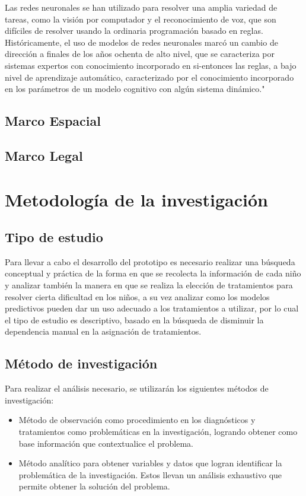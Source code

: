 		Las redes neuronales se han utilizado para resolver una amplia variedad de tareas, como la visión por computador y el reconocimiento de voz, que son difíciles de resolver usando la ordinaria programación basado en reglas. Históricamente, el uso de modelos de redes neuronales marcó un cambio de dirección a finales de los años ochenta de alto nivel, que se caracteriza por sistemas expertos con conocimiento incorporado en si-entonces las reglas, a bajo nivel de aprendizaje automático, caracterizado por el conocimiento incorporado en los parámetros de un modelo cognitivo con algún sistema dinámico."
	\subsection{Marco Espacial}
	\subsection{Marco Legal}
\newpage
\section{Metodología de la investigación}
	\subsection{Tipo de estudio}
		Para llevar a cabo el desarrollo del prototipo es necesario realizar una búsqueda conceptual y práctica de la forma en que se recolecta la información de cada niño y analizar también la manera en que se realiza la elección de tratamientos para resolver cierta dificultad en los niños, a su vez analizar como los modelos predictivos pueden dar un uso adecuado a los tratamientos a utilizar, por lo cual el tipo de estudio es descriptivo, basado en la búsqueda de disminuir la dependencia manual en la asignación de tratamientos.
		\subsection{Método de investigación}
		Para realizar el análisis necesario, se utilizarán los siguientes métodos de investigación:
		\begin{itemize}
			\item Método de observación como procedimiento en los diagnósticos y tratamientos como problemáticas en la investigación, logrando obtener como base información que contextualice el problema.
			\item Método analítico para obtener variables y datos que logran identificar la problemática de la investigación. Estos llevan un análisis exhaustivo que permite obtener la solución del problema.
		\end{itemize}

